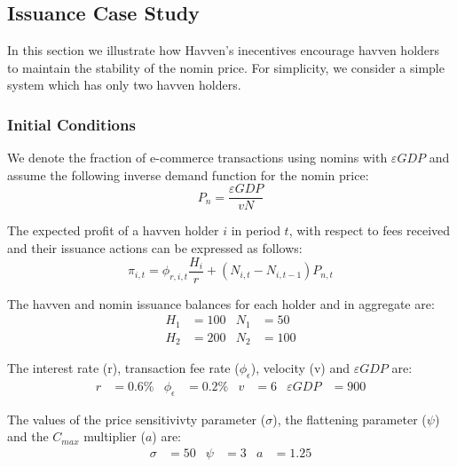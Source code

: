\newpage

\subsection{Issuance Case Study} In this section we illustrate how Havven's inecentives encourage havven holders to maintain the stability of the nomin price. For simplicity, we consider a simple system which has only two havven holders.

\subsubsection{Initial Conditions} We denote the fraction of e-commerce transactions using nomins with $\varepsilon GDP$ and assume the following inverse demand function for the nomin price:
\begin{equation*}
P_n = \frac{\varepsilon GDP}{vN} 
\end{equation*}

\noindent The expected profit of a havven holder $i$ in period $t$, with respect to fees received and their issuance actions can be expressed as follows: 
\begin{equation*}
\pi_{i,t} = \phi_{r,i,t} \frac{H_i}{r} + (N_{i,t} - N_{i,t-1}) P_{n,t}
\end{equation*}

\noindent The havven and nomin issuance balances for each holder and in aggregate are:
\begin{align*}
H_1 &= 100 & N_1 &= 50 \\
H_2 &= 200 & N_2 &= 100
\end{align*}

\noindent The interest rate (r), transaction fee rate ($\phi_\epsilon$), velocity (v) and $\varepsilon GDP$ are:
\begin{align*}
r &= 0.6\% & \phi_\epsilon &= 0.2\% & v &= 6 & \varepsilon GDP &= 900
\end{align*}

\noindent The values of the price sensitivivty parameter ($\sigma$), the flattening parameter ($\psi$) and the $C_{max}$ multiplier ($a$) are: 
\begin{align*}
\sigma &= 50 & \psi &= 3 & a&= 1.25
\end{align*}

